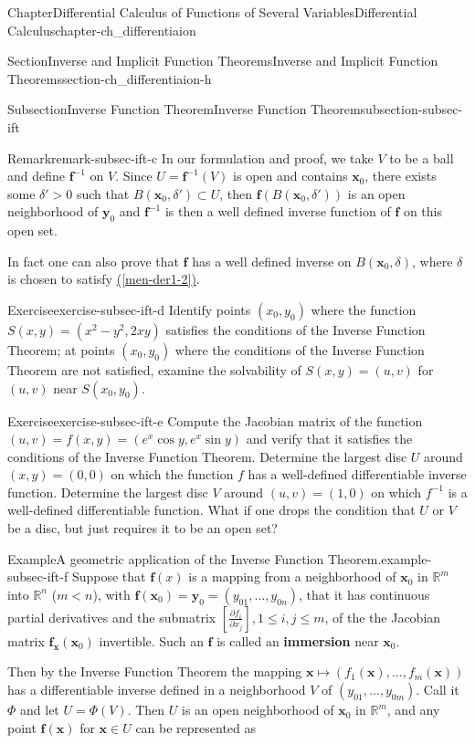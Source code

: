 \documentclass[oneside,10pt,]{book}
\newcommand{\xreffont}{\relax}
\newcommand{\terminology}[1]{\textbf{#1}}
\numberwithin{equation}{section}
\newcommand{\bff}{\mathbf{f}}
\newcommand{\bx}{\mathbf{x}}
\newcommand{\by}{\mathbf{y}}
\newcommand{\bbR}{\mathbb{R}}
\newcommand{\lt}{<}
\begin{document}
\begin{chapterptx}{Chapter}{Differential Calculus of Functions of Several Variables}{}{Differential Calculus}{}{}{chapter-ch_differentiaion}
\begin{sectionptx}{Section}{Inverse and Implicit Function Theorems}{}{Inverse and Implicit Function Theorems}{}{}{section-ch_differentiaion-h}
\begin{subsectionptx}{Subsection}{Inverse Function Theorem}{}{Inverse Function Theorem}{}{}{subsection-subsec-ift}
\begin{remark}{Remark}{}{remark-subsec-ift-c}
In our formulation and proof, we take \(V\) to be a ball and define \({\mathbf f}^{-1}\) on \(V\). Since \(U=\bff^{-1}(V)\) is open and contains \(\bx_{0}\), there exists some \(\delta' >0\) such that \(B(\bx_{0}, \delta')\subset U\), then \(\bff(B(\bx_{0}, \delta'))\) is an open neighborhood of \(\by_{0}\) and \(\bff^{-1}\) is then a well defined inverse function of \(\bff\) on this open set.%
\par
In fact one can also prove that \(\bff\) has a well defined inverse on \(B(\bx_{0}, \delta)\), where \(\delta\) is chosen to satisfy \hyperref[men-der1-2]{({\xreffont\ref{men-der1-2}})}.%
\end{remark}
\begin{inlineexercise}{Exercise}{}{exercise-subsec-ift-d}%
Identify points \((x_{0}, y_{0})\) where  the function \(S(x, y)=(x^{2}-y^{2}, 2 x y)\) satisfies the conditions of the Inverse Function Theorem; at points \((x_{0}, y_{0})\) where the conditions of the Inverse Function Theorem are not satisfied, examine the solvability of \(S(x, y)=(u, v)\) for \((u, v)\) near \(S(x_{0}, y_{0})\).\end{inlineexercise}%
\begin{inlineexercise}{Exercise}{}{exercise-subsec-ift-e}%
Compute the Jacobian matrix of the function \((u, v)=f(x, y)=(e^{x}\cos y, e^{x}\sin y)\) and verify that it satisfies the conditions of the Inverse Function Theorem. Determine the largest disc \(U\) around \((x, y)=(0, 0)\) on which the function \(f\) has a well-defined differentiable inverse function. Determine the largest disc \(V\) around \((u, v)=(1, 0)\) on which  \(f^{-1}\) is a well-defined differentiable function. What if one drops the condition that \(U\) or \(V\) be a disc, but just requires it to be an open set?\end{inlineexercise}%
\begin{example}{Example}{A geometric application of the Inverse Function Theorem.}{example-subsec-ift-f}%
Suppose that \(\bff(x)\) is a  mapping from a neighborhood of \(\bx_0\) in \(\mathbb R^m \) into \(\mathbb R^n\) (\(m \lt  n\)), with \(\bff(\bx_0)=\by_0=(y_{01},\ldots, y_{0n})\), that it has continuous partial derivatives and the submatrix \([\frac{\partial f_i}{\partial x_j}], 1 \le i, j \le m\), of the the Jacobian matrix  \(\bff_{\bx}(\bx_0)\) invertible. Such an \(\bff\) is called an \terminology{immersion} near \(\bx_0\).%
\par
Then by the Inverse Function Theorem the mapping \(\bx\mapsto (f_{1}(\bx),\ldots, f_{m}(\bx))\) has a differentiable inverse defined in a neighborhood \(V\) of \((y_{01},\ldots, y_{0m})\). Call it \(\Phi\) and let \(U=\Phi(V)\). Then \(U\) is an open neighborhood of \(\bx_{0}\) in \(\bbR^{m}\), and any point \(\bff(\bx)\) for \(\bx \in U\) can be represented as%

\end{example}
\end{subsectionptx}
\end{sectionptx}
\end{chapterptx}
\end{document}
